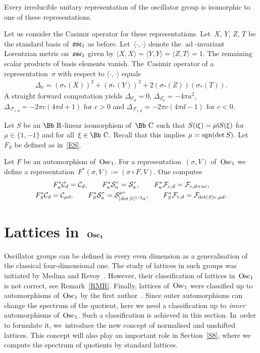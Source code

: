 \documentclass[10pt,a4paper]{amsart}
\newcommand\CC{{\mbox{\Bb C}}}
\newcommand\RR{{\mbox{\Bb R}}}
\newcommand\cC{{\mathcal C}}
\newcommand\cF{{\mathcal F}}
\newcommand\osc{\frak o \frak s \frak c}
\newcommand{\Osc}{{\rm Osc}}
\newcommand{\sgn}{\mathop{{\rm sgn}}}
\numberwithin{equation}{section}
\begin{document}
Every irreducible unitary representation of the oscillator group is isomorphic to one of these representations.

Let us consider the Casimir operator for these representations. Let~$X$, $Y$, $Z$, $T$ be the standard basis of~$\osc_1$ as before. Let~$\langle\cdot,\cdot\rangle$ denote the $\operatorname{ad}$-invariant Lorentzian metric on~$\osc_1$ given by
$\langle X,X\rangle=\langle Y,Y\rangle=\langle Z,T\rangle=1$.
The remaining scalar products of basis elements vanish.
The~Casi\-mir operator of a representation~$\sigma$ with respect to $\langle\cdot,\cdot\rangle$ equals
\begin{gather*}
\Delta_\sigma=(\sigma_*(X))^2+(\sigma_*(Y))^2+2(\sigma_*(Z))(\sigma_*(T)).
\end{gather*}
A straight forward computation yields $\Delta_{\cC_d}=0$, $\Delta_{{\mathcal S}_a^\tau}=-4\pi a^2$,
$\Delta_{\cF_{c,d}}=-2\pi c(4\pi d+1)$ for $c>0$
 and $\Delta_{\cF_{c,d}}=-2\pi c(4\pi d-1)$ for $c<0$.

Let $S$ be an $\RR$-linear isomorphism of~$\CC$ such that $S({\rm i}\xi)=\mu {\rm i}S(\xi)$ for $\mu\in\{1,-1\}$ and for all~$\xi\in\CC$. Recall that this implies
$\mu=\sgn(\det S)$. Let~$F_S$ be defined as in~\eqref{ES}.

Let $F$ be an automorphism of~$\Osc_1$. For a representation~$(\sigma,V)$ of~$\Osc_1$ we define a representation~$F^*(\sigma,V):=(\sigma\circ F,V)$. One computes
\begin{gather}
F_u^*\cC_d =\cC_d,\qquad
F_u^*{\mathcal S}^\tau_a ={\mathcal S}^\tau_a,\qquad
F_u^*{\mathcal F}_{c,d} ={\mathcal F}_{c,d+uc}, \nonumber
\\
F_S^*\cC_d =\cC_{\mu d},\qquad
F_S^*{\mathcal S}^\tau_a ={\mathcal S}^{\mu\tau}_{|\hspace{-1pt}\det S|^{1/2}a},\qquad
F_S^*{\mathcal F}_{c,d} ={\mathcal F}_{\hspace{-1pt}\det(S) c,\mu d}.
\label{Fiso}
\end{gather}

\section[Lattices in~$\Osc_1$]{Lattices in~$\boldsymbol{\Osc_1}$}\label{S4}
Oscillator groups can be defined in every even dimension as a generalisation of the classical four-dimensional one. The study of lattices in such groups was initiated by Medina and Revoy~\cite{MR}. However, their classification of lattices in~$\Osc_1$ is not correct, see Remark~\ref{RMR}. Finally, lattices of~$\Osc_1$ were classified up to automorphisms of~$\Osc_1$ by the first author~\cite{F}. Since outer automorphisms can change the spectrum of the quotient, here we need a classification up to {\it inner} automorphisms of~$\Osc_1$. Such a classification is achieved in this section. In~order to formulate it, we~introduce the new concept of normalised and unshifted lattices. This concept will also play an important role in Section~\ref{S8}, where we compute the spectrum of quotients by standard lattices.
\end{document}
